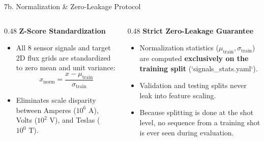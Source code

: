 \documentclass[aspectratio=169, 10pt]{beamer}
\begin{document}
\begin{frame}{7b. Normalization \& Zero-Leakage Protocol}
  \begin{columns}[T]
    \begin{column}{0.48\textwidth}
      \textbf{\color{NavyBlue} Z-Score Standardization}
      \begin{itemize}
        \item All 8 sensor signals and target 2D flux grids are standardized to zero mean and unit variance:
        $$x_{\text{norm}} = \frac{x - \mu_{\text{train}}}{\sigma_{\text{train}}}$$
        \item Eliminates scale disparity between Amperes ($10^6\text{ A}$), Volts ($10^2\text{ V}$), and Teslas ($10^0\text{ T}$).
      \end{itemize}
    \end{column}

    \begin{column}{0.48\textwidth}
      \textbf{\color{NavyBlue} Strict Zero-Leakage Guarantee}
      \begin{itemize}
        \item Normalization statistics ($\mu_{\text{train}}, \sigma_{\text{train}}$) are computed \textbf{exclusively on the training split} (`signals\_stats.yaml`).
        \item Validation and testing splits never leak into feature scaling.
        \item Because splitting is done at the shot level, no sequence from a training shot is ever seen during evaluation.
      \end{itemize}
    \end{column}
  \end{columns}
\end{frame}
\end{document}
